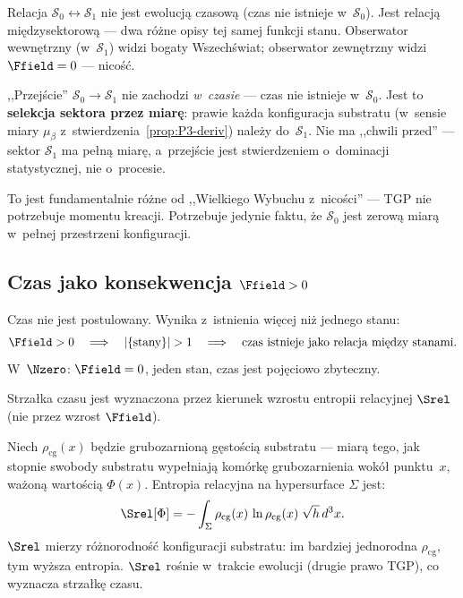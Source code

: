 Relacja $\mathcal{S}_0 \leftrightarrow \mathcal{S}_1$ nie jest
ewolucj\k{a} czasow\k{a} (czas nie istnieje w~$\mathcal{S}_0$).
Jest relacj\k{a} mi\k{e}dzysektorow\k{a} --- dwa r\'o\.zne opisy
tej samej funkcji stanu. Obserwator wewn\k{e}trzny (w~$\mathcal{S}_1$)
widzi bogaty Wszech\'swiat; obserwator zewn\k{e}trzny widzi $\Ffield = 0$
--- nico\'s\'c.

\begin{remark}
,,Przej\'scie'' $\mathcal{S}_0 \to \mathcal{S}_1$ nie zachodzi
\emph{w~czasie} --- czas nie istnieje w~$\mathcal{S}_0$.
Jest to \textbf{selekcja sektora przez miar\k{e}}: prawie
ka\.zda konfiguracja substratu (w~sensie miary $\mu_\beta$
z~stwierdzenia~\ref{prop:P3-deriv}) nale\.zy
do~$\mathcal{S}_1$. Nie ma ,,chwili przed'' ---
sektor $\mathcal{S}_1$ ma pe\l{}n\k{a} miar\k{e}, a~przej\'scie
jest stwierdzeniem o~dominacji statystycznej, nie o~procesie.

To jest fundamentalnie r\'o\.zne od ,,Wielkiego Wybuchu
z~nico\'sci'' --- TGP nie potrzebuje momentu kreacji.
Potrzebuje jedynie faktu, \.ze $\mathcal{S}_0$ jest zerow\k{a}
miar\k{a} w~pe\l{}nej przestrzeni konfiguracji.
\end{remark}

\subsection{Czas jako konsekwencja $\Ffield > 0$}\label{ssec:czas}

\begin{proposition}\label{prop:czas}
Czas nie jest postulowany. Wynika z~istnienia wi\k{e}cej ni\.z jednego
stanu:
\begin{equation}
    \Ffield > 0
    \quad\Longrightarrow\quad
    |\{\text{stany}\}| > 1
    \quad\Longrightarrow\quad
    \text{czas istnieje jako relacja mi\k{e}dzy stanami.}
\end{equation}
W~$\Nzero$: $\Ffield = 0$, jeden stan, czas jest poj\k{e}ciowo
zbyteczny.
\end{proposition}

Strza\l{}ka czasu jest wyznaczona przez kierunek wzrostu
entropii relacyjnej $\Srel$ (nie przez wzrost $\Ffield$).

\begin{definition}\label{def:Srel}
Niech $\rho_{\mathrm{cg}}(x)$ b\k{e}dzie grubozarnion\k{a}
g\k{e}sto\'sci\k{a} substratu --- miar\k{a} tego, jak
stopnie swobody substratu wype\l{}niaj\k{a} kom\'ork\k{e}
grubozarnienia wok\'o\l{} punktu~$x$, wa\.zon\k{a}
warto\'sci\k{a} $\Phi(x)$. Entropia relacyjna na hypersurface
$\Sigma$ jest:
\begin{equation}\label{eq:Srel}
    \Srel[\Phi] = -\int_\Sigma \rho_{\mathrm{cg}}(x)\,
    \ln\rho_{\mathrm{cg}}(x)\;\sqrt{h}\,d^3x.
\end{equation}
$\Srel$ mierzy r\'o\.znorodno\'s\'c konfiguracji substratu:
im bardziej jednorodna $\rho_{\mathrm{cg}}$, tym wy\.zsza
entropia. $\Srel$ ro\'snie w~trakcie ewolucji (drugie prawo TGP),
co wyznacza strza\l{}k\k{e} czasu.
\end{definition}

